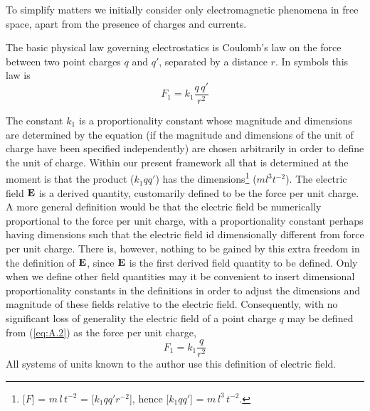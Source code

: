 To simplify matters we initially consider only electromagnetic phenomena in free space, apart from the presence of charges and currents.

The basic physical law governing electrostatics is Coulomb's law on the force between two point charges $q$ and $q'$, separated by a distance $r$. In symbols this law is
\begin{equation}\label{eq:A.2}
F_1 = k_1 \frac{q\,q'}{r^2}
\end{equation}

The constant $k_1$ is a proportionality constant whose magnitude and dimensions  are determined by the equation (if the magnitude and dimensions of the unit of charge have been specified independently)  are chosen arbitrarily in order to define the unit of charge. Within our present framework all that is determined at the moment is that the product ($k_1 q q'$) has the dimensions\footnote{[$F$] = $m\,l\,t^{-2}$ =  [$k_1 q q' r^{-2}$], hence [$k_1 q q'$] = $m\,l^3\,t^{-2}$. } ($m l^3 t^{-2}$). 
The electric field $\vb{E}$ is a derived quantity, customarily defined to be the force per unit charge. A more general definition would be that the electric field be numerically proportional to the force per unit charge, with a proportionality constant perhaps having dimensions such that the electric field id dimensionally different from force per unit charge. There is, however, nothing to be gained by this extra freedom in the definition of $\vb{E}$, since $\vb{E}$ is the first derived field quantity to be defined. Only when we define other field quantities may it be convenient to insert dimensional proportionality constants in the definitions in order to adjust the dimensions and magnitude of these fields relative to the electric field. Consequently, with no significant loss of generality the electric field of a point charge $q$ may be defined from (\ref{eq:A.2}) as the force per unit charge, 
\begin{equation}\label{eq:A.3}
F_1 = k_1 \frac{q}{r^2}
\end{equation}
All systems of units known to the author use this definition of electric field.


